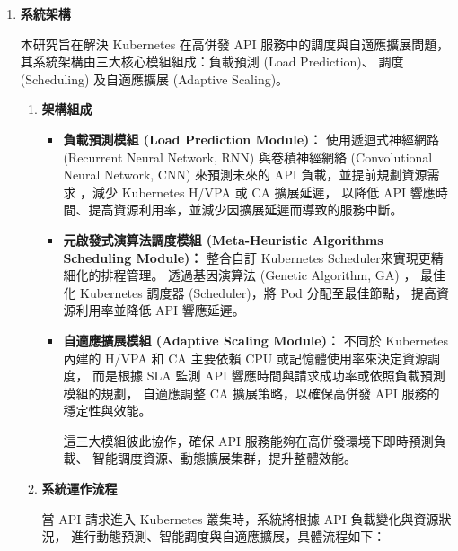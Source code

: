 \documentclass[12pt,a4paper]{article}
\begin{document}
\begin{enumerate}[label={(\zhdig*)}, leftmargin=2\parindent, listparindent=\parindent]
\begin{enumerate}[label={(\arabic*)}, leftmargin=\parindent, listparindent=\parindent]
\item \textbf{
系統架構
}

本研究旨在解決 Kubernetes 在高併發 API 服務中的調度與自適應擴展問題，
其系統架構由三大核心模組組成：負載預測 (Load Prediction)、
調度 (Scheduling) 及自適應擴展 (Adaptive Scaling)。

\begin{enumerate}[label={(\zhdig*)}, leftmargin=\parindent, listparindent=\parindent]
\item \textbf{架構組成}

\begin{itemize}[leftmargin=\parindent, listparindent=\parindent]

    \item \textbf{負載預測模組 (Load Prediction Module)：}
    使用遞迴式神經網路 (Recurrent Neural Network, RNN)
    與卷積神經網絡 (Convolutional Neural Network, CNN)
    來預測未來的 API 負載，並提前規劃資源需求
    ，減少 Kubernetes H/VPA 或 CA 擴展延遲，
    以降低 API 響應時間、提高資源利用率，並減少因擴展延遲而導致的服務中斷。

    \item \textbf{元啟發式演算法調度模組
        (Meta-Heuristic Algorithms Scheduling Module)：}
    整合自訂 Kubernetes Scheduler\cite{18}來實現更精細化的排程管理。
    透過基因演算法 (Genetic Algorithm, GA) ，
    最佳化 Kubernetes 調度器 (Scheduler)，將 Pod 分配至最佳節點，
    提高資源利用率並降低 API 響應延遲。

    \item \textbf{自適應擴展模組 (Adaptive Scaling Module)：}
    不同於 Kubernetes 內建的 H/VPA 和 CA 主要依賴 CPU
    或記憶體使用率來決定資源調度\cite{19}，
    而是根據 SLA 監測 API 響應時間與請求成功率或依照負載預測模組的規劃，
    自適應調整 CA 擴展策略，以確保高併發 API 服務的穩定性與效能。

    這三大模組彼此協作，確保 API 服務能夠在高併發環境下即時預測負載、
    智能調度資源、動態擴展集群，提升整體效能。

\end{itemize}

    \item \textbf{
系統運作流程}

當 API 請求進入 Kubernetes 叢集時，系統將根據 API 負載變化與資源狀況，
進行動態預測、智能調度與自適應擴展，具體流程如下：

\begin{enumerate}[label={(\arabic*)}, leftmargin=\parindent, listparindent=\parindent]


\end{enumerate}
\end{enumerate}
\end{enumerate}
\end{enumerate}
\end{document}
